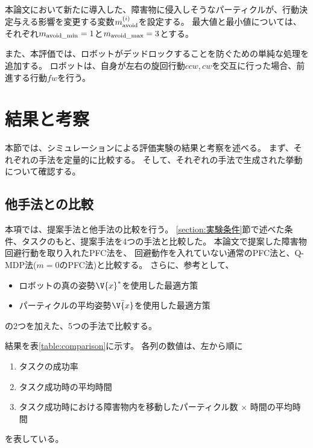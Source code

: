 本論文において新たに導入した、障害物に侵入しそうなパーティクルが、行動決定与える影響を変更する変数$m^{(i)}_{\rm avoid}$を設定する。
最大値と最小値については、それぞれ$m_{\rm avoid\_min} = 1$と$m_{\rm avoid\_max} = 3$とする。

また、本評価では、ロボットがデッドロックすることを防ぐための単純な処理を追加する。
ロボットは、自身が左右の旋回行動$ccw, cw$を交互に行った場合、前進する行動$fw$を行う。


\section{結果と考察} \label{section:結果}
本節では、シミュレーションによる評価実験の結果と考察を述べる。
まず、それぞれの手法を定量的に比較する。
そして、それぞれの手法で生成された挙動について確認する。

\subsection{他手法との比較}
本項では、提案手法と他手法の比較を行う。
\ref{section:実験条件}節で述べた条件、タスクのもと、提案手法を4つの手法と比較した。
本論文で提案した障害物回避行動を取り入れたPFC法を、
回避動作を入れていない通常のPFC法と、Q-MDP法($m=0$のPFC法)と比較する。
さらに、参考として、
\begin{itemize}
  \item ロボットの真の姿勢$\V{x}^{*}$を使用した最適方策
  \item パーティクルの平均姿勢$\bar{\V{x}}$を使用した最適方策
\end{itemize}
の2つを加えた、5つの手法で比較する。

結果を表\ref{table:comparison}に示す。
各列の数値は、左から順に
\begin{enumerate}
  \item タスクの成功率
  \item タスク成功時の平均時間
  \item タスク成功時における障害物内を移動したパーティクル数 $\times$ 時間の平均時間
\end{enumerate}
を表している。

